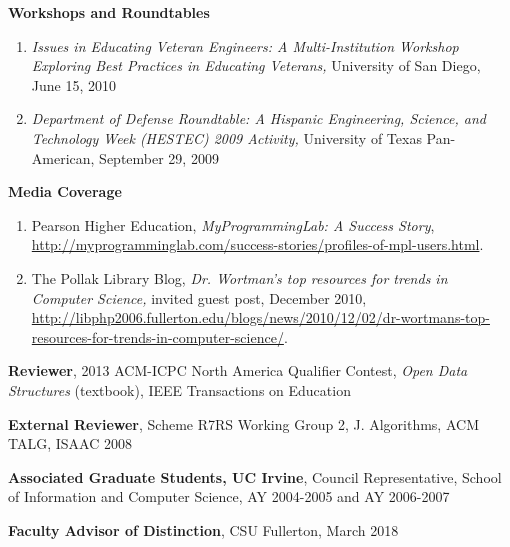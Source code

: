 \documentclass[11pt]{letter}
\begin{document}
\textbf{Workshops and Roundtables}
\begin{enumerate}
\item \emph{Issues in Educating Veteran Engineers: A Multi-Institution Workshop Exploring Best Practices in Educating Veterans,} University of San Diego, June 15, 2010
\item \emph{Department of Defense Roundtable: A Hispanic Engineering, Science, and Technology Week (HESTEC) 2009 Activity,} University of Texas Pan-American, September 29, 2009
\end{enumerate}

\textbf{Media Coverage}
\begin{enumerate}
\item Pearson Higher Education, \emph{MyProgrammingLab: A Success Story}, \url{http://myprogramminglab.com/success-stories/profiles-of-mpl-users.html}.
\item The Pollak Library Blog, \emph{Dr. Wortman's top resources for trends in Computer Science,} invited guest post, December 2010, \url{http://libphp2006.fullerton.edu/blogs/news/2010/12/02/dr-wortmans-top-resources-for-trends-in-computer-science/}.
\end{enumerate}

\textbf{Reviewer}, 2013 ACM-ICPC North America Qualifier Contest, \emph{Open Data Structures} (textbook), IEEE Transactions on Education

\textbf{External Reviewer}, Scheme R7RS Working Group 2, J. Algorithms, ACM TALG, ISAAC 2008



\textbf{Associated Graduate Students, UC Irvine},  Council Representative, School of Information and Computer Science, AY 2004-2005 and AY 2006-2007 


\textbf{Faculty Advisor of Distinction}, CSU Fullerton, March 2018
\end{document}
